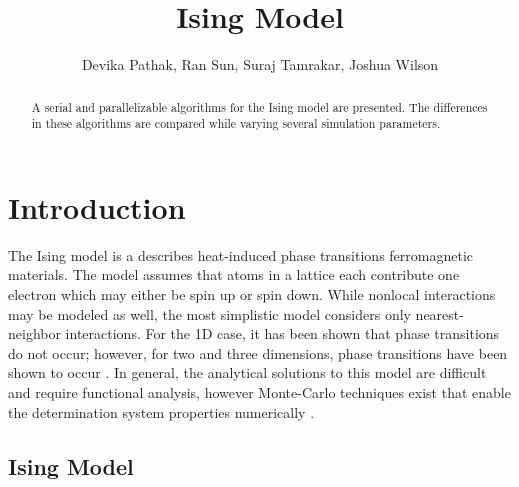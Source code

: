 \documentclass{llncs}
\begin{document}
\title{Ising Model}
%
%
\author{Devika Pathak, Ran Sun, Suraj Tamrakar, Joshua Wilson}
%
%
%

\maketitle              %

\begin{abstract}
A serial and parallelizable algorithms for the Ising model are presented. 
The differences in these  algorithms are compared while varying several simulation parameters. 
\end{abstract}

\section{Introduction}
The Ising model is a describes heat-induced phase transitions ferromagnetic materials. The model assumes that atoms in a lattice each contribute one electron which may either be spin up or spin down. While nonlocal interactions may be modeled as well, the most simplistic model considers only nearest-neighbor interactions. For the 1D case, it has been shown that phase transitions do not occur; however, for two and three dimensions, phase transitions have been shown to occur \cite{}. In general, the analytical solutions to this model are difficult and require functional analysis, however Monte-Carlo techniques exist that enable the determination system properties numerically \cite{}. 
\subsection{Ising Model}
\end{document}
